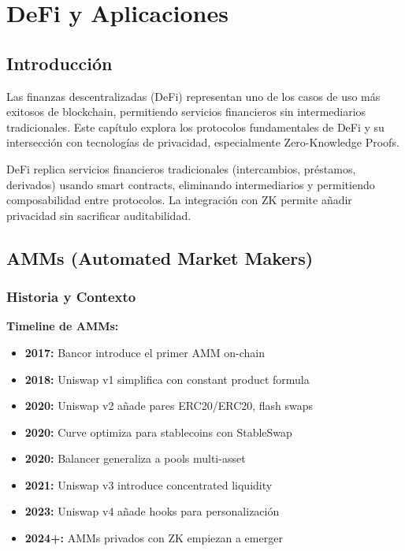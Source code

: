 \documentclass[11pt,a4paper,twoside]{book}
\begin{document}

\chapter{DeFi y Aplicaciones}
\label{ch:defi-aplicaciones}

\section*{Introducci\'on}

Las finanzas descentralizadas (DeFi) representan uno de los casos de uso m\'as exitosos de blockchain, permitiendo servicios financieros sin intermediarios tradicionales. Este cap\'itulo explora los protocolos fundamentales de DeFi y su intersecci\'on con tecnolog\'ias de privacidad, especialmente Zero-Knowledge Proofs.

\begin{keyidea}
DeFi replica servicios financieros tradicionales (intercambios, pr\'estamos, derivados) usando smart contracts, eliminando intermediarios y permitiendo composabilidad entre protocolos. La integraci\'on con ZK permite a\~nadir privacidad sin sacrificar auditabilidad.
\end{keyidea}

\section{AMMs (Automated Market Makers)}
\label{sec:amms}

\subsection{Historia y Contexto}

\begin{mathnote}
\textbf{Timeline de AMMs:}
\begin{itemize}
    \item \textbf{2017:} Bancor introduce el primer AMM on-chain
    \item \textbf{2018:} Uniswap v1 simplifica con constant product formula
    \item \textbf{2020:} Uniswap v2 a\~nade pares ERC20/ERC20, flash swaps
    \item \textbf{2020:} Curve optimiza para stablecoins con StableSwap
    \item \textbf{2020:} Balancer generaliza a pools multi-asset
    \item \textbf{2021:} Uniswap v3 introduce concentrated liquidity
    \item \textbf{2023:} Uniswap v4 a\~nade hooks para personalizaci\'on
    \item \textbf{2024+:} AMMs privados con ZK empiezan a emerger
\end{itemize}
\end{mathnote}
\end{document}
